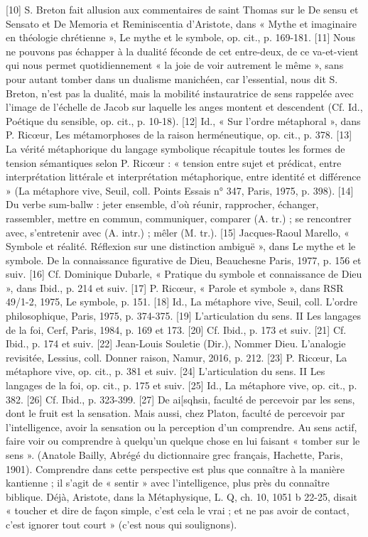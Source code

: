     [10]
    S. Breton fait allusion aux commentaires de saint Thomas sur le De sensu et Sensato et De Memoria et Reminiscentia d’Aristote, dans « Mythe et imaginaire en théologie chrétienne », Le mythe et le symbole, op. cit., p. 169-181.
    [11]
    Nous ne pouvons pas échapper à la dualité féconde de cet entre-deux, de ce va-et-vient qui nous permet quotidiennement « la joie de voir autrement le même », sans pour autant tomber dans un dualisme manichéen, car l’essential, nous dit S. Breton, n’est pas la dualité, mais la mobilité instauratrice de sens rappelée avec l’image de l’échelle de Jacob sur laquelle les anges montent et descendent (Cf. Id., Poétique du sensible, op. cit., p. 10-18).
    [12]
    Id., « Sur l’ordre métaphoral », dans P. Ricœur, Les métamorphoses de la raison herméneutique, op. cit., p. 378.
    [13]
    La vérité métaphorique du langage symbolique récapitule toutes les formes de tension sémantiques selon P. Ricœur : « tension entre sujet et prédicat, entre interprétation littérale et interprétation métaphorique, entre identité et différence » (La métaphore vive, Seuil, coll. Points Essais n° 347, Paris, 1975, p. 398).
    [14]
    Du verbe sum-ballw : jeter ensemble, d’où réunir, rapprocher, échanger, rassembler, mettre en commun, communiquer, comparer (A. tr.) ; se rencontrer avec, s’entretenir avec (A. intr.) ; mêler (M. tr.).
    [15]
    Jacques-Raoul Marello, « Symbole et réalité. Réflexion sur une distinction ambiguë », dans Le mythe et le symbole. De la connaissance figurative de Dieu, Beauchesne Paris, 1977, p. 156 et suiv.
    [16]
    Cf. Dominique Dubarle, « Pratique du symbole et connaissance de Dieu », dans Ibid., p. 214 et suiv.
    [17]
    P. Ricœur, « Parole et symbole », dans RSR 49/1-2, 1975, Le symbole, p. 151.
    [18]
    Id., La métaphore vive, Seuil, coll. L’ordre philosophique, Paris, 1975, p. 374-375.
    [19]
    L’articulation du sens. II Les langages de la foi, Cerf, Paris, 1984, p. 169 et 173.
    [20]
    Cf. Ibid., p. 173 et suiv.
    [21]
    Cf. Ibid., p. 174 et suiv.
    [22]
    Jean-Louis Souletie (Dir.), Nommer Dieu. L’analogie revisitée, Lessius, coll. Donner raison, Namur, 2016, p. 212.
    [23]
    P. Ricœur, La métaphore vive, op. cit., p. 381 et suiv.
    [24]
    L’articulation du sens. II Les langages de la foi, op. cit., p. 175 et suiv.
    [25]
    Id., La métaphore vive, op. cit., p. 382.
    [26]
    Cf. Ibid., p. 323-399.
    [27]
    De ai[sqhsiı, faculté de percevoir par les sens, dont le fruit est la sensation. Mais aussi, chez Platon, faculté de percevoir par l’intelligence, avoir la sensation ou la perception d’un comprendre. Au sens actif, faire voir ou comprendre à quelqu’un quelque chose en lui faisant « tomber sur le sens ». (Anatole Bailly, Abrégé du dictionnaire grec français, Hachette, Paris, 1901). Comprendre dans cette perspective est plus que connaître à la manière kantienne ; il s’agit de « sentir » avec l’intelligence, plus près du connaître biblique. Déjà, Aristote, dans la Métaphysique, L. Q, ch. 10, 1051 b 22-25, disait « toucher et dire de façon simple, c’est cela le vrai ; et ne pas avoir de contact, c’est ignorer tout court » (c’est nous qui soulignons).
